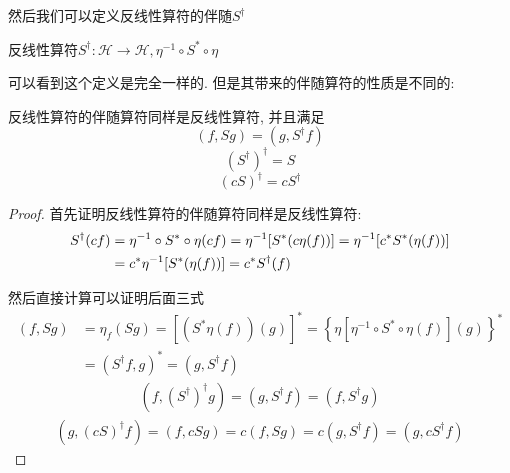 然后我们可以定义反线性算符的伴随$S^\dagger$
\begin{definition}[伴随算符]
    反线性算符$S^\dagger: \mathscr H\to\mathscr H, \eta^{-1}\circ S^*\circ\eta$
\end{definition}
可以看到这个定义是完全一样的. 但是其带来的伴随算符的性质是不同的:
\begin{theorem}[反线性算符的伴随算符的性质]\label{antilinear-adjoint}
    反线性算符的伴随算符同样是反线性算符, 并且满足
    \begin{equation}
        (f, Sg)=(g, S^\dagger f)\label{antilinear-adjoint-eq1}
    \end{equation}
    \begin{equation}
        (S^\dagger)^\dagger=S
    \end{equation}
    \begin{equation}
        (cS)^\dagger=cS^\dagger
    \end{equation}
\end{theorem}
\begin{proof}
    首先证明反线性算符的伴随算符同样是反线性算符:
    \begin{align}
        S^\dagger(cf)&=\eta^{-1}\circ S^*\circ\eta(cf)=\eta^{-1}[S^*(c\eta(f))]=\eta^{-1}[c^*S^*(\eta(f))]\notag\\
        &=c^*\eta^{-1}[S^*(\eta(f))]=c^*S^\dagger(f)
    \end{align}

    然后直接计算可以证明后面三式
    \begin{align}
        (f, Sg)&=\eta_f(Sg)=\left[(S^*\eta(f))(g)\right]^*=\left\{\eta\left[\eta^{-1}\circ S^*\circ\eta(f)\right](g)\right\}^*\\&
        =(S^\dagger f, g)^*=(g, S^\dagger f)
    \end{align}
    \begin{align}
        (f, (S^\dagger)^\dagger g)=(g, S^\dagger f)=(f, S^\dagger g)
    \end{align}
    \begin{align}
        (g, (cS)^\dagger f)=(f, cSg)=c(f, Sg)=c(g, S^\dagger f)=(g, cS^\dagger f)
    \end{align}
\end{proof}

